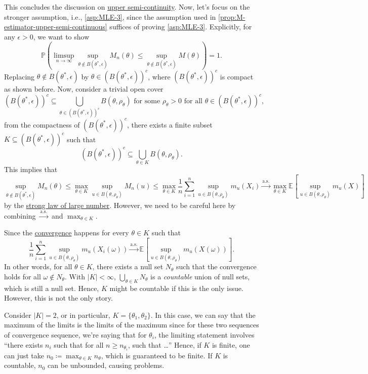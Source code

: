 This concludes the discussion on \hyperref[def:upper-semi-continuous]{upper semi-continuity}. Now, let's focus on the stronger assumption, i.e., \autoref{asp:MLE-3}, since the assumption used in \autoref{prop:M-estimator-upper-semi-continuous} suffices of proving \autoref{asp:MLE-3}. Explicitly, for any \(\epsilon > 0\), we want to show
\[
	\mathbb{P} \left( \limsup_{n \to \infty} \sup _{\theta \notin B(\theta ^{\ast} , \epsilon )} M_n(\theta ) \leq \sup _{\theta \notin B(\theta ^{\ast} , \epsilon )} M(\theta ) \right)
	= 1.
\]
Replacing \(\theta \notin B(\theta ^{\ast} , \epsilon )\) by \(\theta \in (B(\theta ^{\ast} , \epsilon ))^{c} \), where \((B(\theta ^{\ast} , \epsilon ))^{c}\) is compact as shown before. Now, consider a trivial open cover
\[
	(B(\theta ^{\ast} , \epsilon ))^{c}
	\subseteq \bigcup_{\theta \in (B(\theta ^{\ast} , \epsilon ))^{c} } B(\theta , \rho _\theta ) \text{ for some } \rho _\theta > 0 \text{ for all } \theta \in (B(\theta ^{\ast} , \epsilon ))^{c} ,
\]
from the compactness of \((B(\theta ^{\ast} , \epsilon ))^{c} \), there exists a finite subset \(K \subseteq (B(\theta ^{\ast} , \epsilon ))^{c} \) such that
\[
	(B(\theta ^{\ast} , \epsilon ))^{c}
	\subseteq \bigcup_{\theta \in K} B(\theta , \rho _\theta ).
\]
This implies that
\[
	\sup _{\theta \notin B(\theta ^{\ast} , \epsilon )} M_n(\theta )
	\leq \max _{\theta \in K} \sup _{u \in B(\theta , \rho _\theta )} M_n(u)
	\leq \max _{\theta \in K} \frac{1}{n}\sum_{i=1}^{n} \sup _{u \in B(\theta , \rho _\theta )} m_u(X_i)
	\overset{\text{a.s.} }{\to} \max _{\theta \in K} \mathbb{E}_{}\left[\sup _{u \in B(\theta , \rho _\theta )} m_u(X) \right]
\]
by the \hyperref[thm:SLLN]{strong law of large number}. However, we need to be careful here by combining \(\overset{\text{a.s.} }{\to} \) and \(\max _{\theta \in K}\).

\begin{note}
	Since the \hyperref[def:converge-almost-surely]{convergence} happens for every \(\theta \in K\) such that
	\[
		\frac{1}{n} \sum_{i=1}^{n} \sup _{u \in B(\theta , \rho _\theta )} m_u(X_i(\omega ))
		\overset{\text{a.s.} }{\to} \mathbb{E}_{}\left[ \sup _{u \in B(\theta , \rho _\theta )} m_u(X(\omega )) \right].
	\]
	In other words, for all \(\theta \in K\), there exists a null set \(N_\theta \) such that the convergence holds for all \(\omega \notin N_\theta \). With \(\lvert K \rvert < \infty \), \(\bigcup_{\theta \in K} N_\theta \) is a \emph{countable} union of null sets, which is still a null set. Hence, \(K\) might be countable if this is the only issue. However, this is not the only story.

	Consider \(\lvert K \rvert = 2\), or in particular, \(K = \{ \theta _1, \theta _2 \} \). In this case, we can say that the maximum of the limits is the limits of the maximum since for these two sequences of convergence sequence, we're saying that for \(\theta _i\), the limiting statement involves ``there exists \(n_i\) such that for all \(n \geq n_{\theta _i}\), such that \dots'' Hence, if \(K\) is finite, one can just take \(n_0 \coloneqq \max _{\theta \in K} n_{\theta }\), which is guaranteed to be finite. If \(K\) is countable, \(n_0\) can be unbounded, causing problems.
\end{note}


